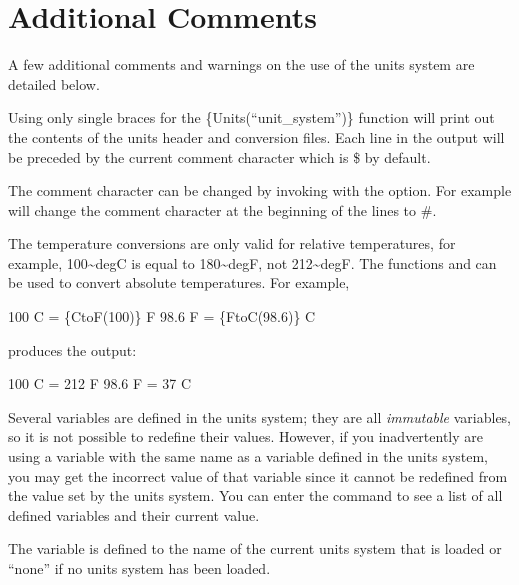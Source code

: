 \section{Additional Comments}

A few additional comments and warnings on the use of the units system are detailed
below.

Using only single braces for the \{Units(``unit\_system'')\}
function will print out the contents of the units header and conversion files.
Each line in the output will be preceded by the current comment character which
is \$ by default.

The comment character can be changed by invoking \aprepro{} with the
 option. For example 
will change the comment character at the beginning of the lines to \#.

The temperature conversions are only valid for relative temperatures, for
example, 100\textasciitilde{}degC is equal to 180\textasciitilde{}degF, not 212\textasciitilde{}degF.
The functions  and  can be used to convert absolute temperatures.  For example,
\begin{apinp}
100 C = \{CtoF(100)\} F
98.6 F = \{FtoC(98.6)\} C
\end{apinp}
produces the output:
\begin{apout}
100 C = 212 F
98.6 F = 37 C
\end{apout}

Several variables are defined in the units system; they are all
\textit{immutable} variables, so it is not possible to
redefine their values.  However, if you inadvertently are using a
variable with the same name as a variable defined in the units system,
you may get the incorrect value of that variable since it cannot be
redefined from the value set by the units system. You can enter the
command  to see a list of all defined variables and their
current value.

The \aprepro{} variable  is defined to the name
of the current units system that is loaded or ``none'' if no units
system has been loaded.
